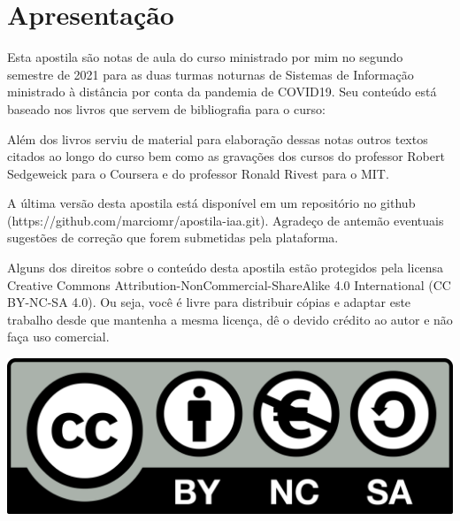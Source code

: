 \chapter*{Apresentação}

Esta apostila são notas de aula do curso ministrado por mim no segundo semestre de 2021 para as duas turmas noturnas de Sistemas de Informação ministrado à distância por conta da pandemia de COVID19.
Seu conteúdo está baseado nos livros que servem de bibliografia para o curso:

\nocite{sedgewick01,sedgewick11,cormen12}


\printbibliography[heading=none,keyword={bibliografia}]


  Além dos livros serviu de material para elaboração dessas notas outros textos citados ao longo do curso bem como as gravações dos cursos do professor Robert Sedgeweick para o Coursera e do professor Ronald Rivest para o MIT.

  
  A última versão desta apostila está disponível em um repositório no github (https://github.com/marciomr/apostila-iaa.git).
  Agradeço de antemão eventuais sugestões de correção que forem submetidas pela plataforma.

  Alguns dos direitos sobre o conteúdo desta apostila estão protegidos pela licensa Creative Commons Attribution-NonCommercial-ShareAlike 4.0 International (CC BY-NC-SA 4.0).
Ou seja, você  é livre para distribuir cópias e adaptar este trabalho desde que mantenha a mesma licença, dê o devido crédito ao autor e não faça uso comercial.

\begin{center}
  \includegraphics[width=.3\textwidth]{imagens/cc.png}
\end{center}
